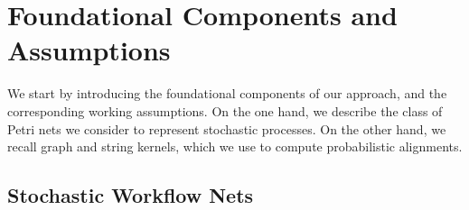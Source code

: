 \section{Foundational Components and Assumptions}
We start by introducing the foundational components of our approach, and the corresponding working assumptions. On the one hand, we describe the class of  Petri nets we consider to represent stochastic processes. On the other hand, we recall graph and string kernels, which we use to compute probabilistic alignments.

\subsection{Stochastic Workflow Nets}\label{subsec:spn}
%
%
